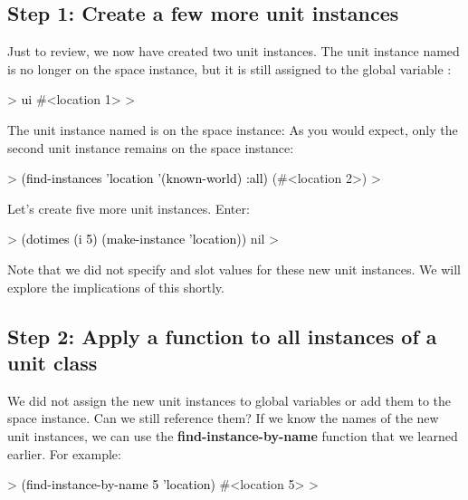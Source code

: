 \documentclass[10pt,twoside,english,pdftex]{article}
\begin{document}
\subsection*{Step 1: Create a few more unit instances}

Just to review, we now have created two  unit instances.  The unit
instance named  is no longer on the  space instance, but it is still assigned to the global variable :
%
%
\begin{example}\color{darkergray}%
  > \textcolor{black}{ui}
  #<location 1> 
  >
\end{example}

The  unit instance named  is on the 
space instance:
%
%
As you would expect, only the second  unit instance remains on the
 space instance:
%
\begin{example}\color{darkergray}%
  > \textcolor{black}{(find-instances 'location '(known-world) :all)}
  (#<location 2>)
  >
\end{example}

Let's create five more  unit instances.  Enter:
%
%
%
\begin{example}\color{darkergray}%
  > \textcolor{black}{(dotimes (i 5) (make-instance 'location))}
  nil
  >
\end{example}
%
Note that we did not specify  and  slot values for these new
unit instances.  We will explore the implications of this shortly.

\subsection*{Step 2: Apply a function to all instances of a unit class}

%
%
%
%
We did not assign the new  unit instances to global variables
or add them to the  space instance.  Can we still reference
them?  If we know the names of the new unit instances, we can use the
\textbf{find-instance-by-name} function that we learned earlier.  For example:
%
\begin{example}\color{darkergray}%
  > \textcolor{black}{(find-instance-by-name 5 'location)}
  #<location 5>
  >
\end{example}
\end{document}
